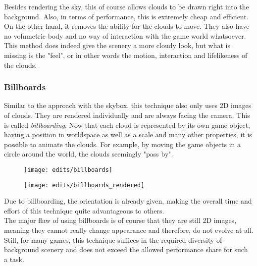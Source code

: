\noindent
Besides rendering the sky, this of course allows clouds to be drawn right into the background. Also, in terms of performance, this is extremely cheap and efficient. On the other hand, it removes the ability for the clouds to move. 
They also have no volumetric body and no way of interaction with the game world whatsoever.
\\
This method does indeed give the scenery a more cloudy look, but what is missing is the "feel", or in other words the motion, interaction and lifelikeness of the clouds.

\subsubsection{Billboards}
Similar to the approach with the skybox, this technique also only uses 2D images of clouds. They are rendered individually and are always facing the camera. This is called \textit{\gls{billboard}ing}.
Now that each cloud is represented by its own game object, having a position in \gls{worldspace} as well as a scale and many other properties, it is possible to animate the clouds. For example, by moving the game objects in a circle around the world, the clouds seemingly "pass by".
\begin{figure}[H]
    \centering
        \begin{minipage}{0.48\linewidth}
            \texttt{[image: edits/billboards]}
            \label{img:edits:billboards}
        \end{minipage}
    \hfill
        \begin{minipage}{0.45\linewidth}
            \texttt{[image: edits/billboards\_rendered]}
            \label{img:edits:billboards_rendered}
        \end{minipage}
\end{figure}
\noindent
Due to billboarding, the orientation is already given, making the overall time and effort of this technique quite advantageous to others.
\\
The major flaw of using billboards is of course that they are still 2D images, meaning they cannot really change appearance and therefore, do not evolve at all. 
Still, for many games, this technique suffices in the required diversity of background scenery and does not exceed the allowed performance share for such a task.

